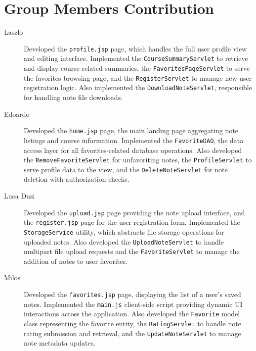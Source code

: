 \section{Group Members Contribution}


\begin{description}

    \item[Laszlo] Developed the \texttt{profile.jsp} page, which handles the full user profile view and editing interface. Implemented the \texttt{CourseSummaryServlet} to retrieve and display course-related summaries, the \texttt{FavoritesPageServlet} to serve the favorites browsing page, and the \texttt{RegisterServlet} to manage new user registration logic. Also implemented the \texttt{DownloadNoteServlet}, responsible for handling note file downloads.

    \item[Edoardo] Developed the \texttt{home.jsp} page, the main landing page aggregating note listings and course information. Implemented the \texttt{FavoriteDAO}, the data access layer for all favorites-related database operations. Also developed the \texttt{RemoveFavoriteServlet} for unfavoriting notes, the \texttt{ProfileServlet} to serve profile data to the view, and the \texttt{DeleteNoteServlet} for note deletion with authorization checks.

    \item[Luca Dusi] Developed the \texttt{upload.jsp} page providing the note upload interface, and the \texttt{register.jsp} page for the user registration form. Implemented the \texttt{StorageService} utility, which abstracts file storage operations for uploaded notes. Also developed the \texttt{UploadNoteServlet} to handle multipart file upload requests and the \texttt{FavoriteServlet} to manage the addition of notes to user favorites.

    \item[Milos] Developed the \texttt{favorites.jsp} page, displaying the list of a user's saved notes. Implemented the \texttt{main.js} client-side script providing dynamic UI interactions across the application. Also developed the \texttt{Favorite} model class representing the favorite entity, the \texttt{RatingServlet} to handle note rating submission and retrieval, and the \texttt{UpdateNoteServlet} to manage note metadata updates.

\end{description}
